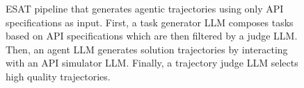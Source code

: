 \begin{figure}[t]
{
    }%
    \caption{\textsc{ESAT} pipeline that generates agentic trajectories using only API specifications as input. First, a task generator LLM composes tasks based on API specifications which are then filtered by a judge LLM. Then, an agent LLM generates solution trajectories by interacting with an API simulator LLM. Finally, a trajectory judge LLM selects high quality trajectories.}
    \label{fig:pipeline}
    \vspace{-0.15in}
\end{figure}
